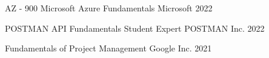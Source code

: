 

\begin{cvhonors}

    \cvhonor
    {AZ - 900 Microsoft Azure Fundamentals} %
    {Microsoft} %
    {} %
    {2022} %

    \cvhonor
    {POSTMAN API Fundamentals Student Expert}
    {POSTMAN Inc.}
    {} %
    {2022} %





    \cvhonor
    {Fundamentals of Project Management} %
    {Google Inc.}
    {} %
    {2021} %

\end{cvhonors}
